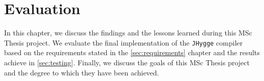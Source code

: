 \chapter{Evaluation}

In this chapter, we discuss the findings and the lessons learned during this MSc Thesis project. We evaluate the final implementation
of the \texttt{JHygge} compiler based on the requirements stated in the \ref{sec:requirements} chapter and the results achieve in
\ref{sec:testing}. Finally, we discuss the goals of this MSc Thesis project and the degree to which they have been achieved.
